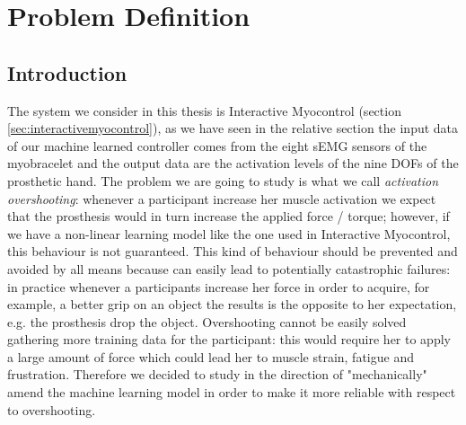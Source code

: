 \chapter{Problem Definition}\label{ch:problem-definition}
\section{Introduction}\label{sec:pd-intro}
The system we consider in this thesis is Interactive Myocontrol (section \ref{sec:interactivemyocontrol}), as we have seen in the relative section the input data of our machine learned controller comes from the eight sEMG sensors of the myobracelet and the output data are the activation levels of the nine DOFs of the prosthetic hand.
The problem we are going to study is what we call \textit{activation overshooting}: whenever a participant increase her muscle activation we expect that the prosthesis would in turn increase the applied force / torque; however, if we have a non-linear learning model like the one used in Interactive Myocontrol, this behaviour is not guaranteed. This kind of behaviour should be prevented and avoided by all means because can easily lead to potentially catastrophic failures: in practice whenever a participants increase her force in order to acquire, for example, a better grip on an object the results is the opposite to her expectation, e.g. the prosthesis drop the object.
Overshooting cannot be easily solved gathering more training data for the participant: this would require her to apply a large amount of force which could lead her to muscle strain, fatigue and frustration. Therefore we decided to study in the direction of "mechanically" amend the machine learning model in order to make it more reliable with respect to overshooting.
%
%
%
